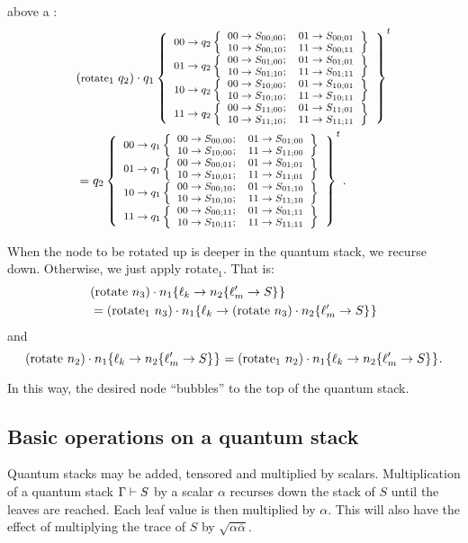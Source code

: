 {\begin{footnotesize}
\begin{singlespace}
\qbit{} above a \qbit{}:
\begin{align*}
&\begin{footnotesize}\qop{(\text{rotate}_1\ q_2)}
  {\qsqbitAllUp{q_1}{\qsqbitUp{q_2}{S_{00;00}}{S_{00;01}}{S_{00;10}}{S_{00;11}}{}}%
   {\qsqbitUp{q_2}{S_{01;00}}{S_{01;01}}{S_{01;10}}{S_{01;11}}{}}%
   {\qsqbitUp{q_2}{S_{10;00}}{S_{10;01}}{S_{10;10}}{S_{10;11}}{}}%
   {\qsqbitUp{q_2}{S_{11;00}}{S_{11;01}}{S_{11;10}}{S_{11;11}}{}}%
   {t}} \end{footnotesize}\\
&\begin{footnotesize}=\qsqbitAllUp{q_2}{\qsqbitUp{q_1}{S_{00;00}}{S_{01;00}}{S_{10;00}}{S_{11;00}}{}}%
    {\qsqbitUp{q_1}{S_{00;01}}{S_{01;01}}{S_{10;01}}{S_{11;01}}{}}%
     {\qsqbitUp{q_1}{S_{00;10}}{S_{01;10}}{S_{10;10}}{S_{11;10}}{}}%
     {\qsqbitUp{q_1}{S_{00;11}}{S_{01;11}}{S_{10;11}}{S_{11;11}}{}}{t}.\end{footnotesize}
\end{align*}
\end{singlespace}
\end{footnotesize}
}

When the node to be rotated up is deeper in the quantum stack, we
recurse down. Otherwise, we just apply $\text{rotate}_1$. That is:
\begin{align*}
&{(\text{rotate}\ n_3)}\cdot{\ensuremath{n_1\{{\ell_k}\to {\ensuremath{n_2\{{\ell'_m}\to {S}\}^{}}}\}^{}}} \\
&=  {(\text{rotate}_1\ n_3)}\cdot{\ensuremath{n_1\{{\ell_k}\to {\ensuremath{{(\text{rotate}\ n_3)}\cdot{\ensuremath{n_2\{{\ell'_m}\to {S}\}^{}}}}}\}^{}}}
\end{align*}
and
\begin{equation*}
{(\text{rotate}\ n_2)}\cdot{\ensuremath{n_1\{{\ell_k}\to {\ensuremath{n_2\{{\ell'_m}\to {S}\}^{}}}\}^{}}} =
  {(\text{rotate}_1\ n_2)}\cdot{\ensuremath{n_1\{{\ell_k}\to {\ensuremath{n_2\{{\ell'_m}\to {S}\}^{}}}\}^{}}}.
\end{equation*}

In this way, the desired node ``bubbles'' to the top of the quantum stack.



\subsection{Basic operations on a quantum stack}\label{subsec:quantumstackbasicops}

Quantum stacks may be added, tensored and multiplied by scalars. 
Multiplication of a quantum stack $\Gamma\vdash S$
 by a scalar $\alpha$ recurses down the stack of $S$
 until the leaves are reached. Each leaf value is then 
multiplied by $\alpha$. This will also have the effect of multiplying the
trace of $S$ by $\sqrt{\alpha\overline{\alpha}}$.

